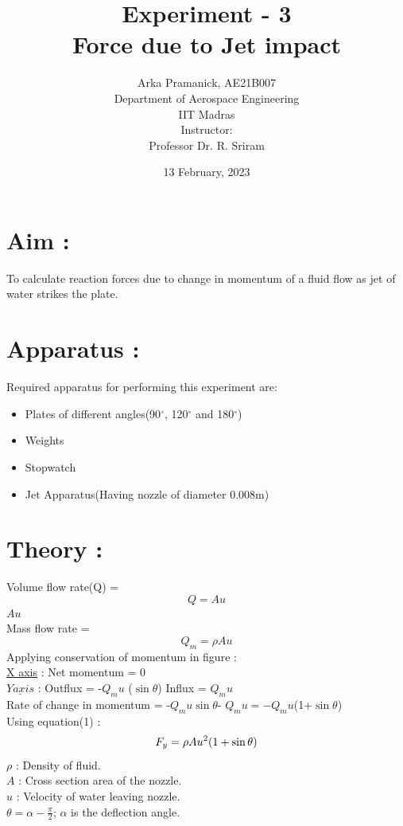\documentclass[12pt,a4paper]{article}
\title{{Experiment - 3\\Force due to Jet impact}}
\author{Arka Pramanick, AE21B007\\ Department of Aerospace Engineering\\ IIT Madras\\[3ex] Instructor:\\ \large Professor Dr. R. Sriram}
\date{13 February, 2023}
\begin{document}
\maketitle

\hline

\section{Aim :}
To calculate reaction forces due to change in momentum of a fluid flow as jet of water strikes the plate. 
\section{Apparatus :}
Required apparatus for performing this experiment are:
\begin{itemize}
    \item Plates of different angles(90$^{\circ}$, 120$^{\circ}$ and 180$^{\circ}$)
    \item Weights
    \item Stopwatch 
    \item Jet Apparatus(Having nozzle of diameter 0.008m)
\end{itemize}

\section{Theory :}


Volume flow rate(Q) =\begin{equation}
    Q = A u
\end{equation} $A u$\\
Mass flow rate = \begin{equation} Q_m =\rho A u    
\end{equation}
Applying conservation of momentum in figure :\\
\underline{X axis} : Net momentum = 0 \\
$\underline{Y axis}$ : Outflux = -$Q_mu$ ($\sin {\theta}$) \hspace{2mm} Influx = $Q_mu$ \\Rate of change in momentum = -$Q_m u\sin {\theta}$- $Q_mu = -Q_mu$(1+$\sin{\theta}$)\\
Using equation(1) :\\
\begin{equation}
F_y = \rho A u^{2}(1 + \sin{\theta})\\
\end{equation}
$\rho$ : Density of fluid.\\
$A$ : Cross section area of the nozzle.\\
$u$ : Velocity of water leaving nozzle.\\
$\theta = \alpha - \frac{\pi}{2}$; $\alpha$ is the deflection angle.
\end{document}
